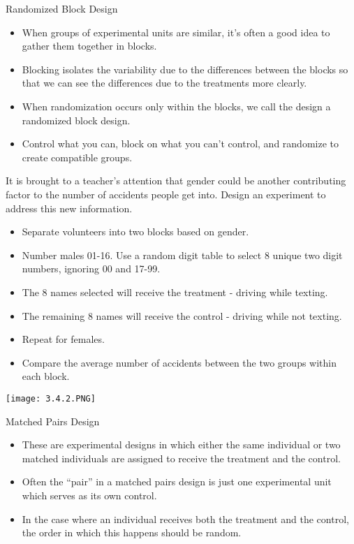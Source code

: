 \documentclass[../stats.tex]{subfiles}
\begin{document}
Randomized Block Design 
\begin{itemize}
    \item When groups of experimental units are similar, it's often a good idea to gather them together in blocks.
    \item Blocking isolates the variability due to the differences between the blocks so that we can see the differences due to the treatments more clearly.
    \item When randomization occurs only within the blocks, we call the design a randomized block design.
    \item Control what you can, block on what you can't control, and randomize to create compatible groups.
\end{itemize}

\begin{example}
    It is brought to a teacher's attention that gender could be another contributing factor to the number of accidents people get into. Design an experiment to address this new information.

    \begin{itemize}
        \item Separate volunteers into two blocks based on gender.
        \item Number males 01-16. Use a random digit table to select 8 unique two digit numbers, ignoring 00 and 17-99.
        \item The 8 names selected will receive the treatment - driving while texting.
        \item The remaining 8 names will receive the control - driving while not texting.
        \item Repeat for females.
        \item Compare the average number of accidents between the two groups within each block.
    \end{itemize}

    \begin{center}
        \texttt{[image: 3.4.2.PNG]}
    \end{center}
\end{example}

Matched Pairs Design 
\begin{itemize}
    \item These are experimental designs in which either the same individual or two matched individuals are assigned to receive the treatment and the control.
    \item Often the ``pair'' in a matched pairs design is just one experimental unit which serves as its own control.
    \item In the case where an individual receives both the treatment and the control, the order in which this happens should be random.
\end{itemize}
\end{document}
